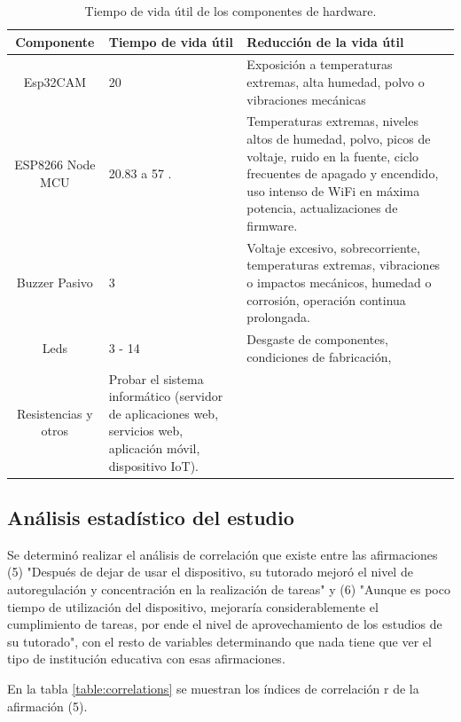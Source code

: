 \documentclass[a4paper,fleqn]{cas-sc}
\begin{document}
				\begin{table}[h]
					\centering
					\caption{Tiempo de vida útil de los componentes de hardware.}
					\label{tab:ShelfLife}
					\begin{tabularx}{\textwidth}{cXX}
						\toprule
						\textbf{Componente} & \textbf{Tiempo de vida útil} & Reducción de la vida útil\\
						\midrule
						Esp32CAM & 20 \cite{Espressif2022ESP32-CAM,Espressif2022ESP32Forum} & Exposición a temperaturas extremas, alta humedad, polvo o vibraciones mecánicas\\
						ESP8266 Node MCU & 20.83 \cite{Amri2018Improving} a 57 \cite{Ardumotica2023,Espressif2022ESP32Forum}. & Temperaturas extremas, niveles altos de humedad, polvo, picos de voltaje, ruido en la fuente, ciclo frecuentes de apagado y encendido, uso intenso de WiFi en máxima potencia, actualizaciones de firmware.\\
						Buzzer Pasivo & 3 \cite{HuawhaElectronics} & Voltaje excesivo, sobrecorriente, temperaturas extremas, vibraciones o impactos mecánicos, humedad o corrosión, operación continua prolongada. \\
						Leds & 3 \cite{Casamayor2015} - 14 \cite{Cary,GreenLighting2024} & Desgaste de componentes, condiciones de fabricación, \\
						Resistencias y otros & Probar el sistema informático (servidor de aplicaciones web, servicios web, aplicación móvil, dispositivo IoT).\\
						\bottomrule
					\end{tabularx}
				\end{table}
				
		\subsection{Análisis estadístico del estudio}
			
			Se determinó realizar el análisis de correlación que existe entre las afirmaciones (5) "Después de dejar de usar el dispositivo, su tutorado mejoró el nivel de autoregulación y concentración en la realización de tareas" y (6) "Aunque es poco tiempo de utilización del dispositivo, mejoraría considerablemente el cumplimiento de tareas, por ende el nivel de aprovechamiento de los estudios de su tutorado", con el resto de variables determinando que nada tiene que ver el tipo de institución educativa con esas afirmaciones.
				
			En la tabla \ref{table:correlations} se muestran los índices de correlación r de la afirmación (5).
				
\end{document}
